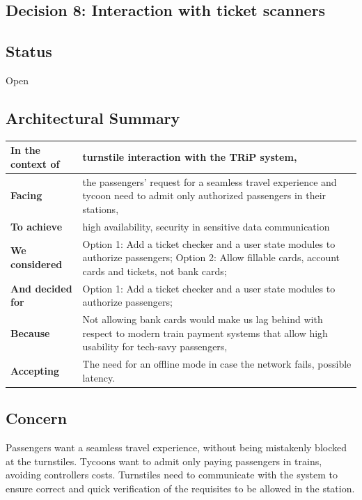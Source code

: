 \subsection{Decision 8: Interaction with ticket scanners}

\subsection*{Status}
Open
\subsection*{Architectural Summary}
\begin{tabular}{|p{3.5cm}|p{10.5cm}|}
    \hline
    \textbf{In the context of} & turnstile interaction with the TRiP system, \\
    \hline
    \textbf{Facing} & the passengers' request for a seamless travel experience and tycoon need to admit only authorized passengers in their stations, \\
    \hline
    \textbf{To achieve} & high availability, security in sensitive data communication \\
    \hline
    \textbf{We considered} & Option 1: Add a ticket checker and a user state modules to authorize passengers; Option 2: Allow fillable cards, account cards and tickets, not bank cards;\\
    \hline
    \textbf{And decided for} & Option 1: Add a ticket checker and a user state modules to authorize passengers;\\
    \hline
    \textbf{Because} & Not allowing bank cards would make us lag behind with respect to modern train payment systems that allow high usability for tech-savy passengers, \\
    \hline
    \textbf{Accepting} & The need for an offline mode in case the network fails, possible latency. \\
    \hline
\end{tabular}

\subsection*{Concern}
Passengers want a seamless travel experience, without being mistakenly blocked at the turnstiles.
Tycoons want to admit only paying passengers in trains, avoiding controllers costs.
Turnstiles need to communicate with the system to ensure correct and quick verification of the requisites to be allowed in the station.

